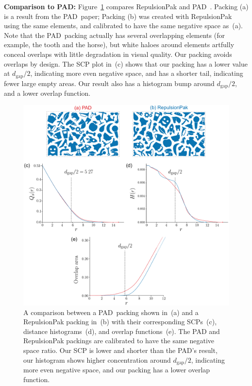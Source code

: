 \textbf{Comparison to PAD:} 
Figure~\ref{pad_comparison} compares
RepulsionPak and PAD~\cite{Kwan2016}.  Packing (a) is
a result from the PAD\ paper; Packing (b) was created with RepulsionPak using
the same elements, and calibrated to have the same negative space as~(a).
Note that the PAD\ packing actually has several overlapping elements
(for example, the tooth and the horse), but white haloes around
elements artfully conceal overlaps with little degradation in
visual quality.  Our packing avoids overlaps by design.
The SCP plot in~(c) shows that our packing has a lower value at $d_\mathrm{gap}/2$,
indicating more even negative space, and has a shorter tail,
indicating fewer large empty areas.
Our result also has a histogram bump around $d_\mathrm{gap}/2$, and 
a lower overlap function.

\begin{figure}
\centering
\includegraphics[width=1.0\textwidth]{figures/metrics/pad_comparison_big.pdf}
\caption[A comparison between a PAD~packing and a RepulsionPak packing]
{\label{pad_comparison}
A comparison between a PAD~packing shown in~(a) and a RepulsionPak packing in~(b) 
with their corresponding SCPs~(c), distance histograms~(d), and overlap functions~(e). 
The PAD and RepulsionPak packings are calibrated
to have the same negative space ratio.
Our SCP is lower and shorter than the PAD's result,
our histogram shows higher concentration around $d_\mathrm{gap} / 2$,
indicating more even negative space,
and our packing has a lower overlap function.
}
\end{figure}



